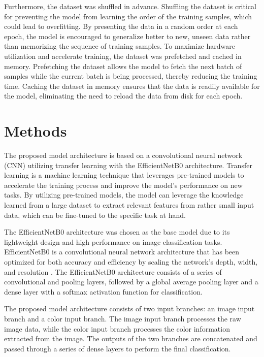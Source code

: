 \documentclass[lettersize,journal]{IEEEtran}
\begin{document}
Furthermore, the dataset was shuffled in advance. Shuffling the dataset is critical for preventing the model from learning the order of the training samples, which could lead to overfitting. By presenting the data in a random order at each epoch, the model is encouraged to generalize better to new, unseen data rather than memorizing the sequence of training samples.
To maximize hardware utilization and accelerate training, the dataset was prefetched and cached in memory. Prefetching the dataset allows the model to fetch the next batch of samples while the current batch is being processed, thereby reducing the training time. Caching the dataset in memory ensures that the data is readily available for the model, eliminating the need to reload the data from disk for each epoch.


\section{Methods}

The proposed model architecture is based on a convolutional neural network (CNN) utilizing transfer learning with the EfficientNetB0 architecture. Transfer learning is a machine learning technique that leverages pre-trained models to accelerate the training process and improve the model's performance on new tasks. By utilizing pre-trained models, the model can leverage the knowledge learned from a large dataset to extract relevant features from rather small input data, which can be fine-tuned to the specific task at hand.

The EfficientNetB0 architecture was chosen as the base model due to its lightweight design and high performance on image classification tasks. EfficientNetB0 is a convolutional neural network architecture that has been optimized for both accuracy and efficiency by scaling the network's depth, width, and resolution \cite{ref2}. The EfficientNetB0 architecture consists of a series of convolutional and pooling layers, followed by a global average pooling layer and a dense layer with a softmax activation function for classification.

The proposed model architecture consists of two input branches: an image input branch and a color input branch. The image input branch processes the raw image data, while the color input branch processes the color information extracted from the image. The outputs of the two branches are concatenated and passed through a series of dense layers to perform the final classification. 
\end{document}

